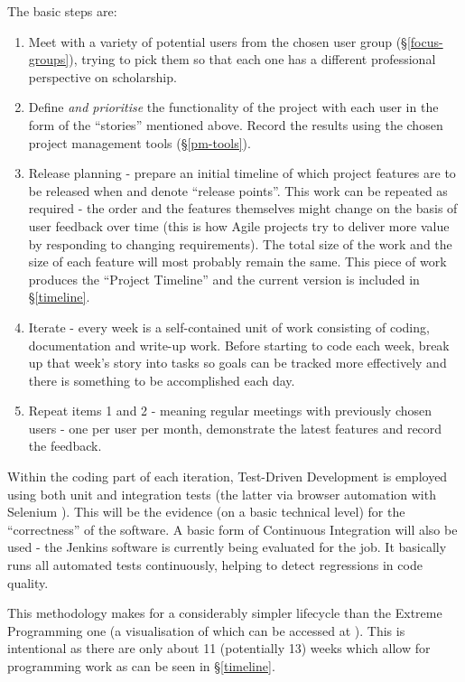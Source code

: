 \documentclass[11pt,fleqn,twoside]{article}
\begin{document}
The basic steps are:
\begin{enumerate}
	\item Meet with a variety of potential users from the chosen user group (\S\ref{focus-groups}), trying to pick them so that each one has a different professional perspective on scholarship.
	\item Define \emph{and prioritise} the functionality of the project with each user in the form of the ``stories'' mentioned above. Record the results using the chosen project management tools (\S\ref{pm-tools}).
	\item Release planning - prepare an initial timeline of which project features are to be released when and denote ``release points''. This work can be repeated as required - the order and the features themselves might change on the basis of user feedback over time (this is how Agile projects try to deliver more value by responding to changing requirements). The total size of the work and the size of each feature will most probably remain the same. This piece of work produces the ``Project Timeline'' and the current version is included in \S\ref{timeline}.
	\item Iterate - every week is a self-contained unit of work consisting of coding, documentation and write-up work. Before starting to code each week, break up that week's story into tasks so goals can be tracked more effectively and there is something to be accomplished each day.
	\item Repeat items 1 and 2 - meaning regular meetings with previously chosen users - one per user per month, demonstrate the latest features and record the feedback.
\end{enumerate}

Within the coding part of each iteration, Test-Driven Development is employed using both unit and integration tests (the latter via browser automation with Selenium \cite{selenium}). This will be the evidence (on a basic technical level) for the ``correctness'' of the software. A basic form of Continuous Integration \cite{ci} will also be used - the Jenkins \cite{jenkins} software is currently being evaluated for the job. It basically runs all automated tests continuously, helping to detect regressions in code quality.

This methodology makes for a considerably simpler lifecycle than the Extreme Programming one (a visualisation of which can be accessed at \cite{xp-lifecycle}). This is intentional as there are only about 11 (potentially 13) weeks which allow for programming work as can be seen in \S\ref{timeline}.
\end{document}
